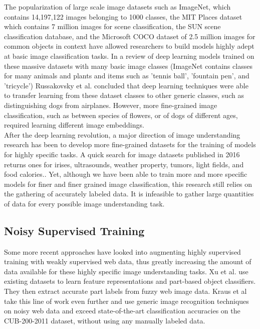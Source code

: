 \documentclass[pageno]{jpaper}
\begin{document}
The popularization of large scale image datasets such as ImageNet, which contains 14,197,122 images belonging to 1000 classes\cite{deng2009imagenet}, the MIT Places dataset which contains 7 million images for scene classification\cite{zhou2014learning}, the SUN scene classification database\cite{xiao2010sun}, and the Microsoft COCO dataset of 2.5 million images for common objects in context\cite{lin2014microsoft} have allowed researchers to build models highly adept at basic image classification tasks\cite{russakovsky2013detecting}. In a review of deep learning models trained on these massive datasets with many basic image classes (ImageNet contains classes for many animals and plants and items such as 'tennis ball', 'fountain pen', and 'tricycle') Russakovsky et al. concluded that deep learning techniques were able to transfer learning from these dataset classes to other generic classes, such as distinguishing dogs from airplanes.\cite{russakovsky2013detecting} However, more fine-grained image classification, such as between species of flowers, or of dogs of different ages, required learning different image embeddings.\\

After the deep learning revolution, a major direction of image understanding research has been to develop more fine-grained datasets for the training of models for highly specific tasks. A quick search for image datasets published in 2016 returns ones for irises, ultrasounds, weather property, tumors, light fields, and food calories.\cite{bowyer2016nd}\cite{cortes2016ultrasound}\cite{chu2016image2weather}\cite{shi2016stacked}\cite{paudyal2016smart}\cite{pouladzadeh2015foodd}. Yet, although we have been able to train more and more specific models for finer and finer grained image classification, this research still relies on the gathering of accurately labeled data. It is infeasible to gather large quantities of data for every possible image understanding task.\\

\subsection*{Noisy Supervised Training}

Some more recent approaches have looked into augmenting highly supervised training with weakly supervised web data, thus greatly increasing the amount of data available for these highly specific image understanding tasks. Xu et al.\cite{xu2015augmenting} use existing datasets to learn feature representations and part-based object classifiers. They then extract accurate part labels from fuzzy web image data. Kraus et al take this line of work even further and use generic image recognition techniques on noisy web data and exceed state-of-the-art classification accuracies on the CUB-200-2011 dataset, without using any manually labeled data.\cite{krause2016unreasonable}\\
\end{document}
